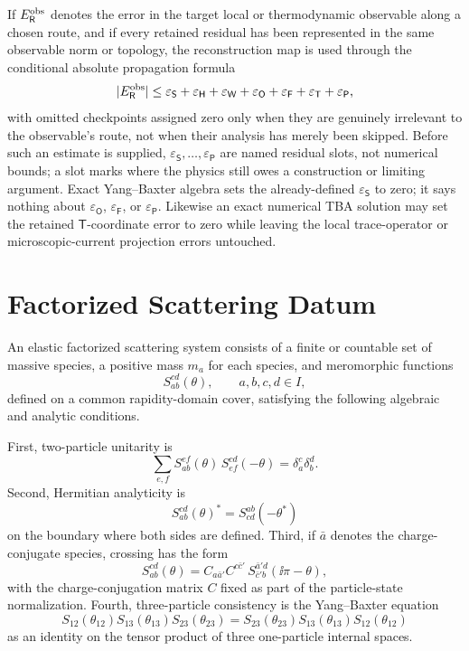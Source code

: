 \begin{remark}
If \(E_{\mathsf R}^{\rm obs}\) denotes the error in the target local or
thermodynamic observable along a chosen route, and if every retained residual
has been represented in the same observable norm or topology, the reconstruction
map is used through the conditional absolute propagation formula
\begin{equation}
  |E_{\mathsf R}^{\rm obs}|
  \le
  \varepsilon_{\mathsf S}
  +\varepsilon_{\mathsf H}
  +\varepsilon_{\mathsf W}
  +\varepsilon_{\mathsf O}
  +\varepsilon_{\mathsf F}
  +\varepsilon_{\mathsf T}
  +\varepsilon_{\mathsf P},
  \label{eq:integrable-route-ledger-budget}
\end{equation}
with omitted checkpoints assigned zero only when they are genuinely irrelevant
to the observable's route, not when their analysis has merely been skipped.
Before such an estimate is supplied, \(\varepsilon_{\mathsf S},\ldots,
\varepsilon_{\mathsf P}\) are named residual slots, not numerical bounds; a slot
marks where the physics still owes a construction or limiting argument.  Exact
Yang--Baxter algebra sets the already-defined \(\varepsilon_{\mathsf S}\) to
zero; it says nothing about \(\varepsilon_{\mathsf O}\),
\(\varepsilon_{\mathsf F}\), or \(\varepsilon_{\mathsf P}\).  Likewise an exact
numerical TBA solution may set the retained \(\mathsf T\)-coordinate error to
zero while leaving the local trace-operator or microscopic-current projection
errors untouched.
\end{remark}

\section{Factorized Scattering Datum}

\begin{definition}
\label{def:elastic-factorized-scattering-system}
An elastic factorized scattering system consists of a finite or countable set
of massive species, a positive mass \(m_a\) for each species, and meromorphic
functions
\[
  S_{ab}^{cd}(\theta),
  \qquad a,b,c,d\in I,
\]
defined on a common rapidity-domain cover, satisfying the following algebraic
and analytic conditions.

First, two-particle unitarity is
\[
  \sum_{e,f}
  S_{ab}^{ef}(\theta)\,
  S_{ef}^{cd}(-\theta)
  =
  \delta_a^{c}\delta_b^{d}.
\]
Second, Hermitian analyticity is
\[
  S_{ab}^{cd}(\theta)^\ast
  =
  S_{cd}^{ab}(-\theta^\ast)
\]
on the boundary where both sides are defined.  Third, if
\(\bar a\) denotes the charge-conjugate species, crossing has the form
\[
  S_{ab}^{cd}(\theta)
  =
  C_{a\bar a'}C^{c\bar c'}\,
  S_{\bar c' b}^{\bar a' d}(\ii\pi-\theta),
\]
with the charge-conjugation matrix \(C\) fixed as part of the particle-state
normalization.  Fourth, three-particle consistency is the Yang--Baxter
equation
\[
  S_{12}(\theta_{12})S_{13}(\theta_{13})S_{23}(\theta_{23})
  =
  S_{23}(\theta_{23})S_{13}(\theta_{13})S_{12}(\theta_{12})
\]
as an identity on the tensor product of three one-particle internal spaces.
\end{definition}

